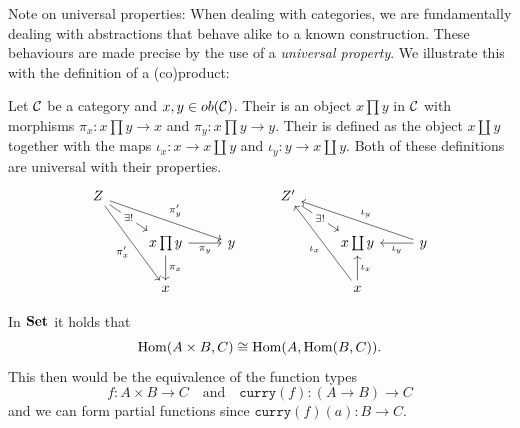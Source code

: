 Note on universal properties: When dealing with categories, we are fundamentally dealing with abstractions that behave alike to a known construction. These behaviours are made precise by the use of a \emph{universal property}. We illustrate this with the definition of a (co)product: 

\begin{definition}\label{app:def:product_coproduct}
  Let $\mathcal{C}$ be a category and $x,y \in ob(\mathcal{C})$. Their \emph{} is an object $x \prod y$ in $\mathcal{C}$ with morphisms $\pi_x : x \prod y \to x$ and $\pi_y : x \prod y \to y$. Their \emph{} is defined as the object $x \coprod y$ together with the maps $\iota_x : x \to x \coprod y$ and $\iota_y : y \to x \coprod y$. Both of these definitions are universal with their properties. 
  \[\begin{tikzcd}
	  Z &&& {Z^\prime} && \\
	  & {x \prod y} & y && {x\coprod y} & y \\
	  & x &&& x
	  \arrow["{\exists!}"{description}, from=1-1, to=2-2]
	  \arrow["{\pi^\prime_y}", from=1-1, to=2-3]
	  \arrow["{\pi_x^\prime}"', from=1-1, to=3-2]
	  \arrow["{\pi_y}"', from=2-2, to=2-3]
	  \arrow["{\pi_x}", from=2-2, to=3-2]
	  \arrow["{\exists!}"{description}, from=1-4, to=2-5]
	  \arrow["{\iota_y}"', from=2-6, to=1-4]
	  \arrow["{\iota_y}", from=2-6, to=2-5]
	  \arrow["{\iota_x}", from=3-5, to=1-4]
	  \arrow["{\iota_x}"', from=3-5, to=2-5]
  \end{tikzcd}\]
\end{definition}

\begin{definition}
	In $\mathbf{Set}$ it holds that 
	\[
		\operatorname{Hom}(A \times B, C) \cong \operatorname{Hom}(A, \operatorname{Hom}(B, C)).
	\]
	This then would be the equivalence of the function types
	\[
		f : A \times B \to C \quad \text{and} \quad \texttt{curry}(f) : (A \to B) \to C
	\]
	and we can form partial functions since $\texttt{curry}(f)(a) : B \to C$.
\end{definition}


